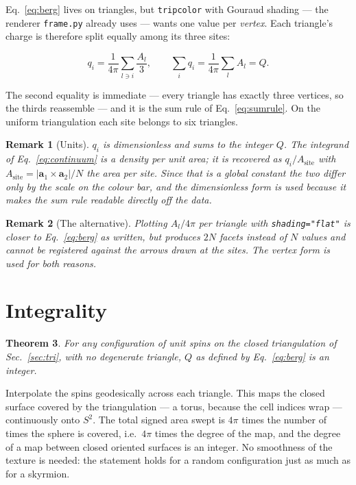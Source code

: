 \documentclass[12pt, a4paper, oneside]{article}
\newtheorem{theorem}{Theorem}
\newtheorem{remark}[theorem]{Remark}
\newcommand{\avec}{\mathbf{a}}
\newcommand{\Na}{N}
\begin{document}
Eq.~\eqref{eq:berg} lives on triangles, but \texttt{tripcolor} with Gouraud
shading --- the renderer \texttt{frame.py} already uses --- wants one value per
\emph{vertex}. Each triangle's charge is therefore split equally among its
three sites:

\begin{equation}
\boxed{
    q_i = \frac{1}{4\pi}\sum_{l \ni i} \frac{A_l}{3} ,
    \qquad \sum_i q_i = \frac{1}{4\pi}\sum_l A_l = Q .
}
\label{eq:density}
\end{equation}

The second equality is immediate --- every triangle has exactly three vertices,
so the thirds reassemble --- and it is the sum rule of Eq.~\eqref{eq:sumrule}.
On the uniform triangulation each site belongs to six triangles.

\begin{remark}[Units]
$q_i$ is dimensionless and sums to the integer $Q$. The integrand of
Eq.~\eqref{eq:continuum} is a density per unit area; it is recovered as
$q_i/A_{\text{site}}$ with
$A_{\text{site}} = |\avec_1\times\avec_2|/\Na$ the area per site. Since that is
a global constant the two differ only by the scale on the colour bar, and the
dimensionless form is used because it makes the sum rule readable directly off
the data.
\end{remark}

\begin{remark}[The alternative]
Plotting $A_l/4\pi$ per triangle with \texttt{shading="flat"} is closer to
Eq.~\eqref{eq:berg} as written, but produces $2\Na$ facets instead of $\Na$
values and cannot be registered against the arrows drawn at the sites. The
vertex form is used for both reasons.
\end{remark}

\section{Integrality}
\label{sec:integrality}

\begin{theorem}
For any configuration of unit spins on the closed triangulation of
Sec.~\ref{sec:tri}, with no degenerate triangle, $Q$ as defined by
Eq.~\eqref{eq:berg} is an integer.
\end{theorem}

Interpolate the spins geodesically across each triangle. This maps the closed
surface covered by the triangulation --- a torus, because the cell indices wrap
--- continuously onto $S^2$. The total signed area swept is $4\pi$ times the
number of times the sphere is covered, i.e.\ $4\pi$ times the degree of the map,
and the degree of a map between closed oriented surfaces is an integer. No
smoothness of the texture is needed: the statement holds for a random
configuration just as much as for a skyrmion.
\end{document}
